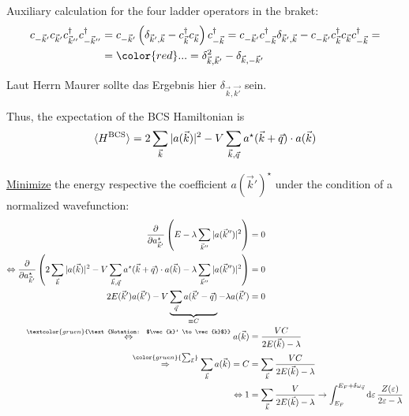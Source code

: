 \documentclass{article}
\newcommand{\diff}{\mathrm{d}}
\newcommand{\lr}[1]{\left(#1\right)}
\newcommand{\commenttext}[1]{\textcolor{gruen}{\text{#1}}}
\newcommand{\comment}[1]{{\color{gruen} {#1}}}
\begin{document}
{	Auxiliary calculation for the four ladder operators in the braket:
		\begin{align*}
			c_{-\vec{k}'} c_{\vec{k}'} c_{\vec{k}''}^\dagger c_{-\vec{k}''}^\dagger &= c_{-\vec{k}'} \lr{ \delta_{\vec{k}',\vec{k}} - c_{\vec{k}}^\dagger c_{\vec{k}} } c_{-\vec{k}}^\dagger = c_{-\vec{k}'} c_{-\vec{k}}^\dagger \delta_{\vec{k}',\vec{k}} - c_{-\vec{k}'} c_{\vec{k}}^\dagger c_{\vec{k}} c_{-\vec{k}}^\dagger = \\
			&= {\color{red} ... = \delta^2_{\vec{k},\vec{k}'} - \delta_{\vec{k}, -\vec{k}'}}
		\end{align*}
	
	{\color{red} Laut Herrn Maurer sollte das Ergebnis hier $\delta_{\vec{k},\vec{k'}}$ sein.}



	Thus, the expectation of the BCS Hamiltonian is
		\begin{align*}
			\braket{H^\text{BCS}} = 2 \sum_{\vec{k}} |a(\vec{k})|^2 - V \sum_{\vec{k},\vec{q}} a^\star(\vec{k} + \vec{q}) \cdot a(\vec{k})
		\end{align*}

	\underline{Minimize} the energy respective the coefficient $a(\vec{k}')^\star$ under the condition of a normalized wavefunction:
		\begin{align*}
			\frac{\partial}{\partial a_{\vec{k}'}^\star} \lr{ E - \lambda \sum_{\vec{k}''} |a(\vec{k}'')|^2 } &= 0 \\
			\Leftrightarrow \frac{\partial}{\partial a_{\vec{k}'}^\star} \lr{ 2 \sum_{\vec{k}} |a(\vec{k})|^2 - V \sum_{\vec{k},\vec{q}} a^\star(\vec{k} + \vec{q}) \cdot a(\vec{k}) - \lambda \sum_{\vec{k}''} |a(\vec{k}'')|^2 } &= 0 \\
			2E(\vec{k}')a(\vec{k}') - V \underbrace{ \sum_{\vec{q}} a(\vec{k}'-\vec{q}) }_{\equiv C} - \lambda a(\vec{k}') &= 0 \\
			\stackrel{\commenttext{Notation: $\vec{k}' \to \vec{k}$}}{\Leftrightarrow} a(\vec{k}) &= \frac{VC}{2E(\vec{k}) - \lambda} \\
			\stackrel{\comment{\sum_{\vec{k}}}}{\Rightarrow} \sum_{\vec{k}} a(\vec{k}) = C &= \sum_{\vec{k}} \frac{VC}{2E(\vec{k}) - \lambda} \\
			\Leftrightarrow 1 &= \sum_{\vec{k}} \frac{V}{2E(\vec{k}) - \lambda} \to \int_{E_F}^{E_F + \delta\omega_{\vec{q}}} \diff\varepsilon \, \frac{Z(\varepsilon)}{2\varepsilon - \lambda}
		\end{align*}

}
\end{document}
